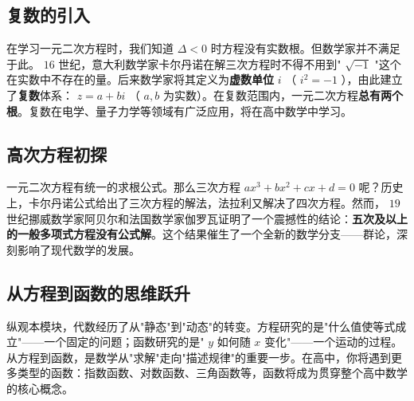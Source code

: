 \subsection*{复数的引入}


在学习一元二次方程时，我们知道 $\Delta < 0$ 时方程没有实数根。但数学家并不满足于此。 $16$ 世纪，意大利数学家卡尔丹诺在解三次方程时不得不用到" $\sqrt{-1}$ "这个在实数中不存在的量。后来数学家将其定义为\textbf{虚数单位} $i$ （ $i^2 = -1$ ），由此建立了\textbf{复数}体系： $z = a + bi$ （ $a, b$ 为实数）。在复数范围内，一元二次方程\textbf{总有两个根}。复数在电学、量子力学等领域有广泛应用，将在高中数学中学习。

\subsection*{高次方程初探}


一元二次方程有统一的求根公式。那么三次方程 $ax^3 + bx^2 + cx + d = 0$ 呢？历史上，卡尔丹诺公式给出了三次方程的解法，法拉利又解决了四次方程。然而， $19$ 世纪挪威数学家阿贝尔和法国数学家伽罗瓦证明了一个震撼性的结论：\textbf{五次及以上的一般多项式方程没有公式解}。这个结果催生了一个全新的数学分支——群论，深刻影响了现代数学的发展。

\subsection*{从方程到函数的思维跃升}


纵观本模块，代数经历了从"静态"到"动态"的转变。方程研究的是"什么值使等式成立"——一个固定的问题；函数研究的是" $y$ 如何随 $x$ 变化"——一个运动的过程。从方程到函数，是数学从"求解"走向"描述规律"的重要一步。在高中，你将遇到更多类型的函数：指数函数、对数函数、三角函数等，函数将成为贯穿整个高中数学的核心概念。
